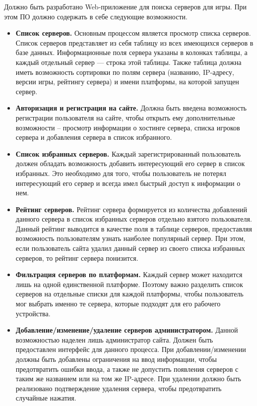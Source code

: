 Должно быть разработано Web-приложение для поиска серверов для игры. При этом ПО должно содержать в себе следующие возможности.

\begin{itemize}
    \item \textbf{Список серверов.} Основным процессом является просмотр списка серверов. Список серверов представляет из себя таблицу из всех имеющихся серверов в базе данных. Информационные поля сервера указаны в колонках таблицы, а каждый отдельный сервер --- строка этой таблицы. Также таблица должна иметь возможность сортировки по полям сервера (названию, IP-адресу, версии игры, рейтингу сервера) и имени платформы, на которой запущен сервер.

    \item \textbf{Авторизация и регистрация на сайте.} Должна быть введена возможность регистрации пользователя на сайте, чтобы открыть ему дополнительные возможности -- просмотр информации о хостинге сервера, списка игроков сервера и добавления сервера в список избранного.

    \item \textbf{Список избранных серверов.} Каждый зарегистрированный пользователь должен обладать возможность добавить интересующий его сервер в список избранных. Это необходимо для того, чтобы пользователь не потерял интересующий его сервер и всегда имел быстрый доступ к информации о нем.

    \item \textbf{Рейтинг серверов.} Рейтинг сервера формируется из количества добавлений данного сервера в список избранных серверов отдельно взятого пользователя. Данный рейтинг выводится в качестве поля в таблице серверов, предоставляя возможность пользователям узнать наиболее популярный сервер. При этом, если пользователь сайта удалил данный сервер из своего списка избранных серверов, то рейтинг сервера понизится.

    \item \textbf{Фильтрация серверов по платформам.} Каждый сервер может находится лишь на одной единственной платформе. Поэтому важно разделить список серверов на отдельные списки для каждой платформы, чтобы пользователь мог выбрать именно те сервера, которые подходят для его рабочего устройства.

    \item \textbf{Добавление/изменение/удаление серверов администратором.} Данной возможностью наделен лишь администратор сайта. Должен быть предоставлен интерфейс для данного процесса. При добавлении/изменении должны быть добавлены ограничения на ввод информации, чтобы предотвратить ошибки ввода, а также не допустить появления серверов с таким же названием или на том же IP-адресе. При удалении должно быть реализовано подтверждение удаления сервера, чтобы предотвратить случайные нажатия.


\end{itemize}
